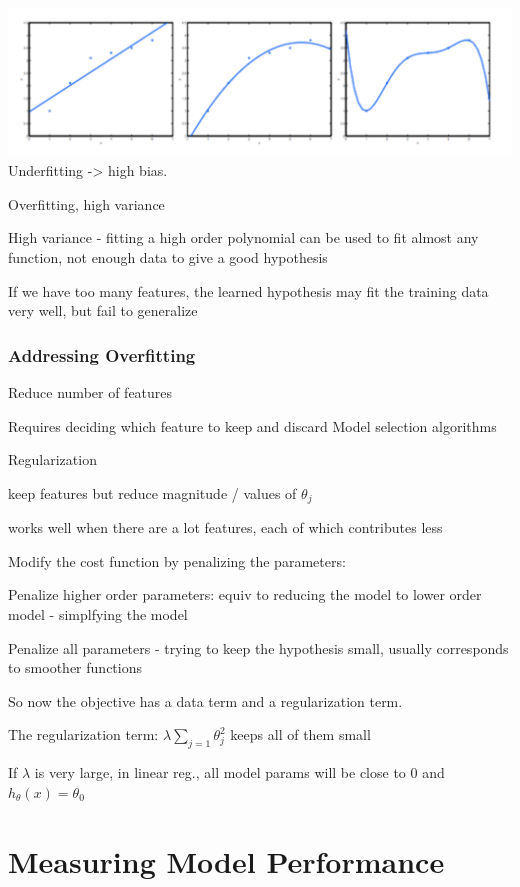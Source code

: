 \includegraphics{ml_figures/overfitting.png}
Underfitting -> high bias.

Overfitting, high variance

High variance - fitting a high order polynomial can be used to fit almost any function, not enough data to give a good hypothesis

If we have too many features, the learned hypothesis may fit the training data very well, but fail to generalize

\subsubsection{Addressing Overfitting}

Reduce number of features

Requires deciding which feature to keep and discard
Model selection algorithms

Regularization

\item keep features but reduce magnitude / values of $\theta_j$ 
\item works well when there are a lot features, each of which contributes less

Modify the cost function by penalizing the parameters:

Penalize higher order parameters: equiv to reducing the model to lower order model - simplfying the model

Penalize all parameters  - trying to keep the hypothesis small, usually corresponds to smoother functions

So now the objective has a data term and a regularization term.

The regularization term: $\lambda\sum_{j=1} \theta_j^2 $ keeps all of them small

If $\lambda $ is very large, in linear reg., all model params will be close to 0 and $h_\theta(x) = \theta_0$  


\section{Measuring Model Performance}

